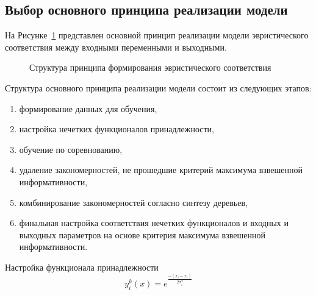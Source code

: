 \subsection{Выбор основного принципа реализации модели}\label{subsec:ch3/sec2/sub1}

На Рисунке~\cref{fig:FLbase} представлен основной принцип реализации модели эвристического соответствия между входными переменными и выходными.
\begin{figure}[ht]
    \caption{Структура принципа формирования эвристического соответствия}\label{fig:FLbase}
\end{figure}

Структура основного принципа реализации модели состоит из следующих этапов:
\begin{enumerate}
    \item формирование данных для обучения,
    \item настройка нечетких функционалов принадлежности,
    \item обучение по соревнованию,
    \item удаление закономерностей, не прошедшие критерий максимума взвешенной информативности,
    \item комбинирование закономерностей согласно синтезу деревьев,
    \item финальная настройка соответствия нечетких функционалов и входных и выходных параметров на основе критерия максимума взвешенной информативности. 
\end{enumerate}

Настройка функционала принадлежности
\begin{equation}
    \label{eq:equation59}
     y_i^{k}(x) = e^{\frac{-(x_i-x_i)}{2\sigma_i^2}}
\end{equation}


